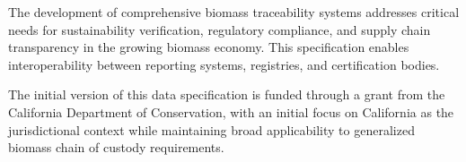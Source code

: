 
The development of comprehensive biomass traceability systems addresses critical needs for sustainability verification, regulatory compliance, and supply chain transparency in the growing biomass economy. This specification enables interoperability between reporting systems, registries, and certification bodies.

\begin{informative}[title=Funding and Jurisdictional Context]
The initial version of this data specification is funded through a grant from the California Department of Conservation, with an initial focus on California as the jurisdictional context while maintaining broad applicability to generalized biomass chain of custody requirements.
\end{informative}